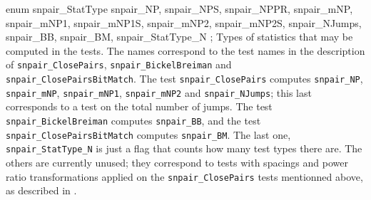 enum snpair_StatType {
   snpair_NP,
   snpair_NPS,
   snpair_NPPR,
   snpair_mNP,
   snpair_mNP1,
   snpair_mNP1S,
   snpair_mNP2,
   snpair_mNP2S,
   snpair_NJumps,
   snpair_BB,
   snpair_BM,
   snpair_StatType_N
};
\endcode
 \tab  Types of statistics that may be computed in the tests.
  The names  correspond to the test names in the  description of
  {\tt snpair\_ClosePairs}, {\tt snpair\_BickelBreiman} and  
  {\tt snpair\_ClosePairs\-Bit\-Match}.
  The test {\tt snpair\_ClosePairs} computes {\tt snpair\_NP}, {\tt snpair\_mNP},
  {\tt snpair\_mNP1}, {\tt snpair\_mNP2} and {\tt snpair\_NJumps}; this last 
  corresponds to a test on the total number of jumps.
  The test {\tt snpair\_BickelBreiman} computes {\tt snpair\_BB}, and
  the test {\tt snpair\_Clo\-se\-Pairs\-Bit\-Match} computes {\tt snpair\_BM}.
  The last one, {\tt snpair\_StatType\_N} is just a flag that counts how
  many test types there are. The others are currently unused; they correspond
  to tests with spacings and power ratio transformations applied on the
  {\tt snpair\_ClosePairs} tests mentionned  above, as described in \cite{rLEC00c}.
 \endtab



\code



